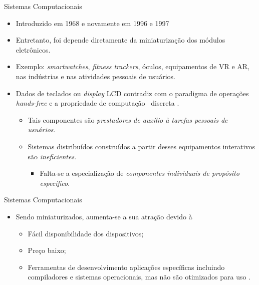    
   \begin{frame} {Sistemas Computacionais \Wearables} \vspace{-1em}
      \begin{itemize}
         \setlength{\itemsep}{1.5em}
         \item Introduzido em 1968 e novamente em 1996 e 1997 \cite{Sutherland1968, Mann1996, Mann1997}
         
         \item Entretanto, foi depende diretamente da miniaturização dos módulos eletrônicos. 
         
         \item Exemplo: \textit{smartwatches}, \textit{fitness trackers}, óculos, equipamentos de VR e AR, nas indústrias e nas atividades pessoais de usuários. 
         
         \item Dados de teclados ou \textit{display} LCD contradiz com o paradigma de operações \textit{hands-free} e a propriedade de computação \wearable\ discreta \cite{Plessl2003}.
         \begin{itemize}
            \setlength{\itemsep}{0.5em}
            \item Tais componentes são \textit{prestadores de auxílio à tarefas pessoais de usuários}.
            \item Sistemas distribuídos construídos a partir desses equipamentos interativos são \textit{ineficientes}.
            \begin{itemize}
               \item Falta-se a especialização de \textit{componentes individuais de propósito específico}.
            \end{itemize}
         \end{itemize}
      \end{itemize}
   \end{frame}

   \begin{frame}{Sistemas Computacionais \Wearables}
      \begin{itemize}
         \item Sendo miniaturizados, aumenta-se a sua atração devido à
         
         \begin{itemize}
            \setlength{\itemsep}{2.0em}
            \item Fácil disponibilidade dos dispositivos;
            \item Preço baixo;
            \item Ferramentas de desenvolvimento aplicações específicas incluindo compiladores e sistemas operacionais, mas não são otimizados para uso \wearable.
         \end{itemize}
         
      \end{itemize}
   \end{frame}
   
